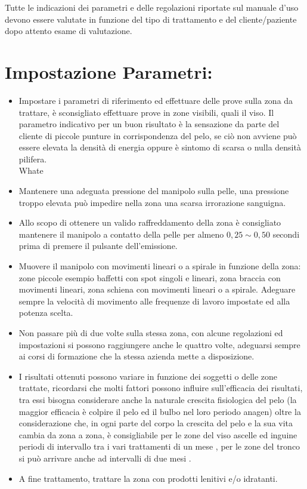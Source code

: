 \documentclass[10pt]{article}
\begin{document}
Tutte le indicazioni dei parametri e delle regolazioni riportate sul manuale d'uso devono essere valutate in funzione del tipo di trattamento e del cliente/paziente dopo attento esame di valutazione.

\section{Impostazione Parametri:}
\begin{itemize}
  \item Impostare i parametri di riferimento ed effettuare delle prove sulla zona da trattare, è sconsigliato effettuare prove in zone visibili, quali il viso. Il parametro indicativo per un buon risultato è la sensazione da parte del cliente di piccole punture in corrispondenza del pelo, se ciò non avviene può essere elevata la densità di energia oppure è sintomo di scarsa o nulla densità pilifera.\\
Whate
  \item Mantenere una adeguata pressione del manipolo sulla pelle, una pressione troppo elevata può impedire nella zona una scarsa irrorazione sanguigna.
  \item Allo scopo di ottenere un valido raffreddamento della zona è consigliato mantenere il manipolo a contatto della pelle per almeno $0,25 \sim 0,50$ secondi prima di premere il pulsante dell'emissione.
  \item Muovere il manipolo con movimenti lineari o a spirale in funzione della zona: zone piccole esempio baffetti con spot singoli e lineari, zona braccia con movimenti lineari, zona schiena con movimenti lineari o a spirale. Adeguare sempre la velocità di movimento alle frequenze di lavoro impostate ed alla potenza scelta.
  \item Non passare più di due volte sulla stessa zona, con alcune regolazioni ed impostazioni si possono raggiungere anche le quattro volte, adeguarsi sempre ai corsi di formazione che la stessa azienda mette a disposizione.
  \item I risultati ottenuti possono variare in funzione dei soggetti o delle zone trattate, ricordarsi che molti fattori possono influire sull'efficacia dei risultati, tra essi bisogna considerare anche la naturale crescita fisiologica del pelo (la maggior efficacia è colpire il pelo ed il bulbo nel loro periodo anagen) oltre la considerazione che, in ogni parte del corpo la crescita del pelo e la sua vita cambia da zona a zona, è consigliabile per le zone del viso ascelle ed inguine periodi di intervallo tra i vari trattamenti di un mese , per le zone del tronco si può arrivare anche ad intervalli di due mesi .
  \item A fine trattamento, trattare la zona con prodotti lenitivi e/o idratanti.
\end{itemize}
\end{document}
